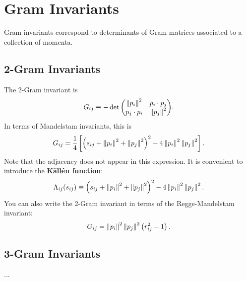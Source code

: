 \section{Gram Invariants}
Gram invariants correspond to determinants of Gram matrices associated to a collection of momenta.
\subsection{2-Gram Invariants}
The 2-Gram invariant is
\begin{equation}
	G_{ij} \equiv - \det{\begin{pmatrix} \left\Vert p_{i} \right\Vert^{2} & p_{i}\cdot p_{j} \\ p_{j} \cdot p_{i} & \left\Vert p_{j} \right\Vert^{2} \end{pmatrix}}.
\end{equation}
In terms of Mandelstam invariants, this is
\begin{equation}
	G_{ij} = \frac{1}{4} \left[ \left( s_{ij} + \left\Vert p_{i} \right\Vert^{2} + \left\Vert p_{j} \right\Vert^{2} \right)^{2} - 4 \left\Vert p_{i} \right\Vert^{2} \left\Vert p_{j} \right\Vert^{2} \right].
\end{equation}
Note that the adjacency does not appear in this expression. It is convenient to introduce the \textbf{K\"{a}ll\'{e}n function}:
\begin{equation}
	\Lambda_{ij}(s_{ij}) \equiv \left( s_{ij} + \left\Vert p_{i} \right\Vert^{2} + \left\Vert p_{j} \right\Vert^{2} \right)^{2} - 4 \left\Vert p_{i} \right\Vert^{2} \left\Vert p_{j} \right\Vert^{2}.
\end{equation}
You can also write the 2-Gram invariant in terms of the Regge-Mandelstam invariant:
\begin{equation}
	G_{ij} = \left\Vert p_{i} \right\Vert^{2} \left\Vert p_{j} \right\Vert^{2} \left( r_{ij}^{2} - 1 \right).
\end{equation}
\subsection{3-Gram Invariants}
...
